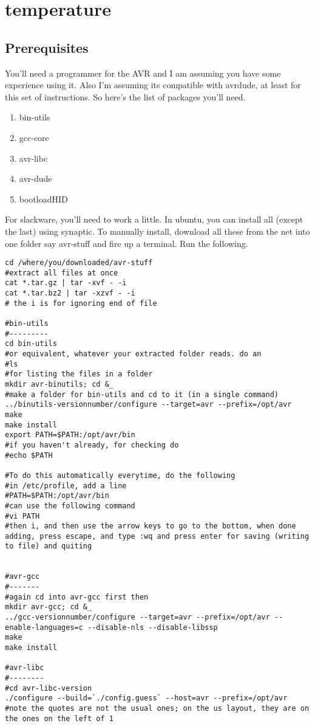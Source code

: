 \section{temperature}
	\subsection{Prerequisites}
		You'll need a programmer for the AVR and I am assuming you have some experience using it. Also I'm assuming its compatible with avrdude, at least for this set of instructions. So here's the list of packages you'll need.
		\begin{enumerate}
			\item bin-utils
			\item gcc-core
			\item avr-libc
			\item avr-dude
			\item bootloadHID
		\end{enumerate}
		For slackware, you'll need to work a little. In ubuntu, you can install all (except the last) using synaptic. To manually install, download all these from the net into one folder say avr-stuff and fire up a terminal. Run the following.
		\begin{lstlisting}
cd /where/you/downloaded/avr-stuff
#extract all files at once
cat *.tar.gz | tar -xvf - -i
cat *.tar.bz2 | tar -xzvf - -i
# the i is for ignoring end of file

#bin-utils
#---------
cd bin-utils
#or equivalent, whatever your extracted folder reads. do an
#ls
#for listing the files in a folder
mkdir avr-binutils; cd &_
#make a folder for bin-utils and cd to it (in a single command)
../binutils-versionnumber/configure --target=avr --prefix=/opt/avr
make
make install
export PATH=$PATH:/opt/avr/bin
#if you haven't already, for checking do 
#echo $PATH

#To do this automatically everytime, do the following
#in /etc/profile, add a line
#PATH=$PATH:/opt/avr/bin
#can use the following command
#vi PATH
#then i, and then use the arrow keys to go to the bottom, when done adding, press escape, and type :wq and press enter for saving (writing to file) and quiting


#avr-gcc
#-------
#again cd into avr-gcc first then
mkdir avr-gcc; cd &_
../gcc-versionnumber/configure --target=avr --prefix=/opt/avr --enable-languages=c --disable-nls --disable-libssp
make
make install

#avr-libc
#--------
#cd avr-libc-version
./configure --build=`./config.guess` --host=avr --prefix=/opt/avr
#note the quotes are not the usual ones; on the us layout, they are on the ones on the left of 1
		\end{lstlisting}
